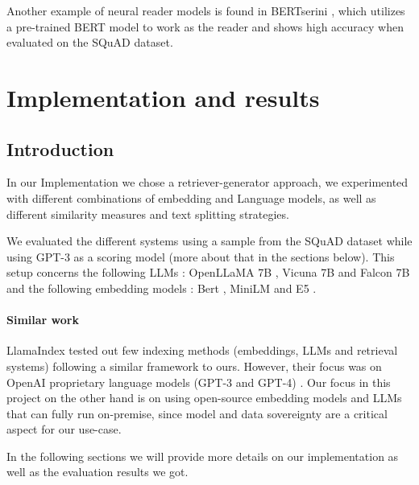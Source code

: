 \documentclass[a4paper,12pt]{article}
\begin{document}
Another example of neural reader models is found in BERTserini \cite{BERTserini}, which utilizes a pre-trained BERT model to work as the reader and shows high accuracy when evaluated on the SQuAD \cite{squad} dataset.
\clearpage
\section{Implementation and results}
\subsection{Introduction}
In our Implementation we chose a retriever-generator approach, we experimented with different combinations of embedding and Language models, as well as different similarity measures and text splitting strategies.

We evaluated the different systems using a sample from the SQuAD \cite{squad} dataset while using GPT-3 \cite{gpt3} as a scoring model (more about that in the sections below).  
This setup concerns the following LLMs : OpenLLaMA 7B \cite{openllama}, Vicuna 7B \cite{vicuna} and Falcon 7B \cite{falcon} and the following embedding models : Bert \cite{bert}, MiniLM \cite{minilm} and E5 \cite{e5}.

\paragraph*{Similar work} LlamaIndex \cite{llamaindex} tested out few indexing methods (embeddings, LLMs and retrieval systems) following a similar framework to ours. 
However, their focus was on OpenAI proprietary language models (GPT-3 and GPT-4) \cite{gpt3, gpt4}. Our focus in this project 
on the other hand is on using open-source embedding models and LLMs that can fully run on-premise, since model and data sovereignty are a critical aspect for our use-case.

In the following sections we will provide more details on our implementation as well as the evaluation results we got.
\end{document}

